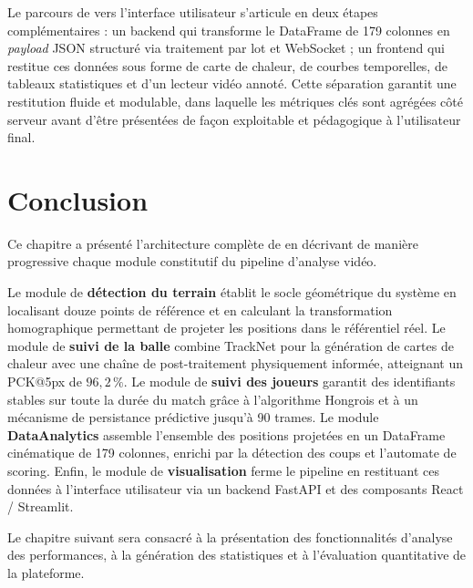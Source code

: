 \begin{synthesebox}
Le parcours de \smartplayai{} vers l'interface utilisateur s'articule en deux étapes
complémentaires : un backend qui transforme le DataFrame de 179 colonnes en
\textit{payload} JSON structuré via traitement par lot et WebSocket ; un frontend
qui restitue ces données sous forme de carte de chaleur, de courbes temporelles,
de tableaux statistiques et d'un lecteur vidéo annoté. Cette séparation garantit
une restitution fluide et modulable, dans laquelle les métriques clés sont agrégées
côté serveur avant d'être présentées de façon exploitable et pédagogique à
l'utilisateur final.
\end{synthesebox}

\section{Conclusion}

Ce chapitre a présenté l'architecture complète de \smartplayai{} en décrivant de
manière progressive chaque module constitutif du pipeline d'analyse vidéo.

Le module de \textbf{détection du terrain} établit le socle géométrique du système
en localisant douze points de référence et en calculant la transformation homographique
permettant de projeter les positions dans le référentiel réel. Le module de
\textbf{suivi de la balle} combine TrackNet pour la génération de cartes de chaleur
avec une chaîne de post-traitement physiquement informée, atteignant un PCK@5px de
$96{,}2\,\%$. Le module de \textbf{suivi des joueurs} garantit des identifiants
stables sur toute la durée du match grâce à l'algorithme Hongrois et à un mécanisme
de persistance prédictive jusqu'à 90 trames. Le module \textbf{DataAnalytics}
assemble l'ensemble des positions projetées en un DataFrame cinématique de 179
colonnes, enrichi par la détection des coups et l'automate de scoring. Enfin, le
module de \textbf{visualisation} ferme le pipeline en restituant ces données à
l'interface utilisateur via un backend FastAPI et des composants React / Streamlit.

Le chapitre suivant sera consacré à la présentation des fonctionnalités d'analyse
des performances, à la génération des statistiques et à l'évaluation quantitative
de la plateforme.
